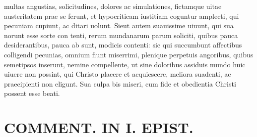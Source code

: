 \documentclass{article}
\begin{document}
\begin{pages}
multas angustias, solicitudines, dolores ac simulationes, fictamque uitae austeritatem prae se ferunt, et hypocriticam iustitiam coguntur amplecti, qui pecuniam cupiunt, ac ditari uolunt. Sieut autem suauissime uiuunt, qui sua norunt esse sorte con tenti, rerum mundanarum parum soliciti, quibus pauca desiderantibus, pauca ab sunt, modicis contenti: sic qui succumbunt affectibus colligendi pecunias, omnium fiunt miserrimi, plenique perpetuis angoribus, quibus semetipsos inserunt, nemine compellente, ut sine doloribus assiduis mundo huic uiuere non possint, qui Christo placere et acquiescere, meliora suadenti, ac praecipienti non eligunt. Sua culpa bis miseri, cum fide et obedientia Christi possent esse beati.  \pend
\section*{COMMENT. IN I. EPIST. }
\marginpar{[ p.536 ]}
{}

\end{pages}
\end{document}
